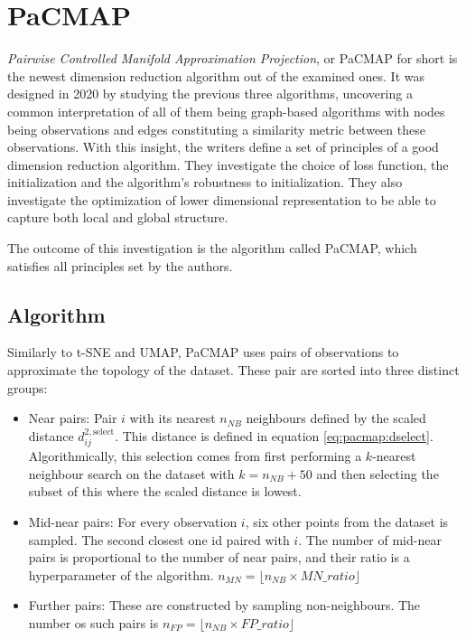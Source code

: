 \section{PaCMAP}\label{sec:pacmap}

\textit{Pairwise Controlled Manifold Approximation Projection}, or PaCMAP \cite{bib:pacmap} for short is the newest dimension reduction algorithm out of the examined ones. It was designed in 2020 by studying the previous three algorithms, uncovering a common interpretation of all of them being graph-based algorithms with nodes being observations and edges constituting a similarity metric between these observations. With this insight, the writers define a set of principles of a good dimension reduction algorithm. They investigate the choice of loss function, the initialization and the algorithm's robustness to initialization. They also investigate the optimization of lower dimensional representation to be able to capture both local and global structure.

The outcome of this investigation is the algorithm called PaCMAP, which satisfies all principles set by the authors. 

\subsection{Algorithm}

Similarly to t-SNE and UMAP, PaCMAP uses pairs of observations to approximate the topology of the dataset. These pair are sorted into three distinct groups:

\begin{itemize}
	\item Near pairs: Pair $i$ with its nearest $n_{NB}$ neighbours defined by the scaled distance $d^{2,\textrm{select}}_{ij}$. This distance is defined in equation \eqref{eq:pacmap:dselect}. Algorithmically, this selection comes from first performing a $k$-nearest neighbour search on the dataset with $k = n_{NB} + 50$ and then selecting the subset of this where the scaled distance is lowest. 
	\item Mid-near pairs: For every observation $i$, six other points from the dataset is sampled. The second closest one id paired with $i$. The number of mid-near pairs is proportional to the number of near pairs, and their ratio is a hyperparameter of the algorithm. $n_{MN} = \lfloor n_{NB} \times MN\_ratio\rfloor$
	\item Further pairs: These are constructed by sampling non-neighbours. The number os such pairs is $n_{FP} = \lfloor n_{NB} \times FP\_ratio \rfloor$
\end{itemize}

